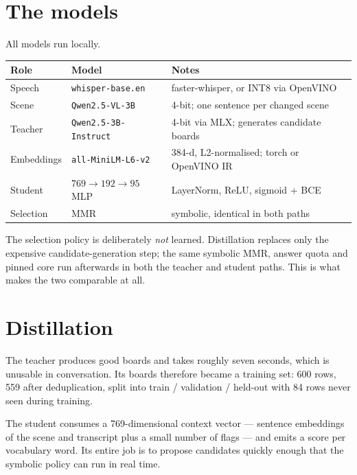 \documentclass[11pt,a4paper]{article}
\newcommand{\code}[1]{\texttt{\small #1}}
\begin{document}
\section{The models}

All models run locally.

\begin{center}
\begin{tabular}{@{}lll@{}}
\toprule
\textbf{Role} & \textbf{Model} & \textbf{Notes} \\
\midrule
Speech        & \code{whisper-base.en}      & faster-whisper, or INT8 via OpenVINO \\
Scene         & \code{Qwen2.5-VL-3B}        & 4-bit; one sentence per changed scene \\
Teacher       & \code{Qwen2.5-3B-Instruct}  & 4-bit via MLX; generates candidate boards \\
Embeddings    & \code{all-MiniLM-L6-v2}     & 384-d, L2-normalised; torch or OpenVINO IR \\
Student       & $769 \to 192 \to 95$ MLP    & LayerNorm, ReLU, sigmoid + BCE \\
Selection     & MMR                         & symbolic, identical in both paths \\
\bottomrule
\end{tabular}
\end{center}

The selection policy is deliberately \emph{not} learned. Distillation replaces only the
expensive candidate-generation step; the same symbolic MMR, answer quota and pinned core
run afterwards in both the teacher and student paths. This is what makes the two
comparable at all.

\section{Distillation}

The teacher produces good boards and takes roughly seven seconds, which is unusable in
conversation. Its boards therefore became a training set: 600 rows, 559 after
deduplication, split into train / validation / held-out with 84 rows never seen during
training.

The student consumes a 769-dimensional context vector --- sentence embeddings of the
scene and transcript plus a small number of flags --- and emits a score per vocabulary
word. Its entire job is to propose candidates quickly enough that the symbolic policy
can run in real time.
\end{document}

